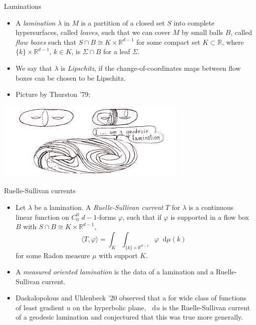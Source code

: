 \documentclass[10pt]{beamer}
\newcommand{\RR}{\mathbb{R}}
\newcommand*\dif{\mathop{}\!\mathrm{d}}
\begin{document}
\begin{frame}{Laminations}
\begin{itemize}
\item A \emph{lamination} $\lambda$ in $M$ is a partition of a closed set $S$ into complete hypersurfaces, called \emph{leaves}, such that we can cover $M$ by small balls $B$, called \emph{flow boxes} such that $S \cap B \cong K \times \RR^{d - 1}$ for some compact set $K \subset \RR$, where $\{k\} \times \RR^{d - 1}$, $k \in K$, is $\Sigma \cap B$ for a leaf $\Sigma$. \pause
\item We say that $\lambda$ is \emph{Lipschitz}, if the change-of-coordinates maps between flow boxes can be chosen to be Lipschitz. \pause
\item Picture by Thurston '79:
\end{itemize}

\begin{center}
    \includegraphics[scale=0.68]{GeodesicLamination.jpg}
\end{center}
\end{frame}

\begin{frame}{Ruelle-Sullivan currents}
\begin{itemize}
\item Let $\lambda$ be a lamination. A \emph{Ruelle-Sullivan current} $T$ for $\lambda$ is a continuous linear function on $C^0_0$ $d - 1$-forms $\varphi$, such that if $\varphi$ is supported in a flow box $B$ with $S \cap B \cong K \times \RR^{d - 1}$,
$$\langle T, \varphi\rangle = \int_K \int_{\{k\} \times \RR^{d - 1}} \varphi \dif \mu(k)$$
for some Radon measure $\mu$ with support $K$. \pause
\item A \emph{measured oriented lamination} is the data of a lamination and a Ruelle-Sullivan current. \pause
\item Daskalopolous and Uhlenbeck '20 observed that a for wide class of functions of least gradient $u$ on the hyperbolic plane, $\dif u$ is the Ruelle-Sullivan current of a geodesic lamination and conjectured that this was true more generally.
\end{itemize}
\end{frame}
\end{document}
